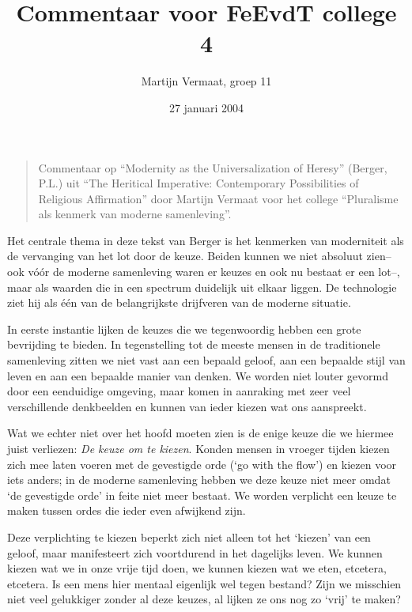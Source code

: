 \documentclass[11pt]{article}
\title{Commentaar voor FeEvdT college 4}
\author{
    Martijn Vermaat, groep 11
}
\date{27 januari 2004}
\begin{document}
\maketitle

\begin{quote}
Commentaar op ``Modernity as the Universalization of Heresy'' (Berger, P.L.) uit ``The Heritical Imperative: Contemporary Possibilities of Religious Affirmation'' door Martijn Vermaat voor het college ``Pluralisme als kenmerk van moderne samenleving''.
\end{quote}

Het centrale thema in deze tekst van Berger is het kenmerken van moderniteit als de vervanging van het lot door de keuze. Beiden kunnen we niet absoluut zien--ook v\'o\'or de moderne samenleving waren er keuzes en ook nu bestaat er een lot--, maar als waarden die in een spectrum duidelijk uit elkaar liggen. De technologie ziet hij als \'e\'en van de belangrijkste drijfveren van de moderne situatie.

In eerste instantie lijken de keuzes die we tegenwoordig hebben een grote bevrijding te bieden. In tegenstelling tot de meeste mensen in de traditionele samenleving zitten we niet vast aan een bepaald geloof, aan een bepaalde stijl van leven en aan een bepaalde manier van denken. We worden niet louter gevormd door een eenduidige omgeving, maar komen in aanraking met zeer veel verschillende denkbeelden en kunnen van ieder kiezen wat ons aanspreekt.

Wat we echter niet over het hoofd moeten zien is de enige keuze die we hiermee juist verliezen: \emph{De keuze om te kiezen}. Konden mensen in vroeger tijden kiezen zich mee laten voeren met de gevestigde orde (`go with the flow') en kiezen voor iets anders; in de moderne samenleving hebben we deze keuze niet meer omdat `de gevestigde orde' in feite niet meer bestaat. We worden verplicht een keuze te maken tussen ordes die ieder even afwijkend zijn.

Deze verplichting te kiezen beperkt zich niet alleen tot het `kiezen' van een geloof, maar manifesteert zich voortdurend in het dagelijks leven. We kunnen kiezen wat we in onze vrije tijd doen, we kunnen kiezen wat we eten, etcetera, etcetera. Is een mens hier mentaal eigenlijk wel tegen bestand? Zijn we misschien niet veel gelukkiger zonder al deze keuzes, al lijken ze ons nog zo `vrij' te maken?
\end{document}
